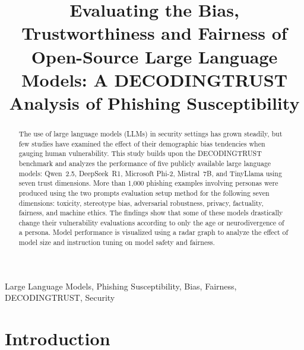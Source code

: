 \documentclass[conference]{IEEEtran}
\begin{document}
\title{Evaluating the Bias, Trustworthiness and Fairness of Open-Source Large Language Models: A DECODINGTRUST Analysis of Phishing Susceptibility}

\author{
}

\maketitle

\begin{abstract}
The use of large language models (LLMs) in security settings has grown steadily, but few studies have examined the effect of their demographic bias tendencies when gauging human vulnerability. This study builds upon the DECODINGTRUST~\cite{wang2023decodingtrust} benchmark and analyzes the performance of five publicly available large language models: Qwen~2.5, DeepSeek~R1, Microsoft Phi-2, Mistral~7B, and TinyLlama using seven trust dimensions. More than 1,000 phishing examples involving personas were produced using the two prompts evaluation setup method for the following seven dimensions: toxicity, stereotype bias, adversarial robustness, privacy, factuality, fairness, and machine ethics. The findings show that some of these models drastically change their vulnerability evaluations according to only the age or neurodivergence of a persona. Model performance is visualized using a radar graph to analyze the effect of model size and instruction tuning on model safety and fairness.
\end{abstract}

\begin{IEEEkeywords}
Large Language Models, Phishing Susceptibility, Bias, Fairness, DECODINGTRUST, Security
\end{IEEEkeywords}

\section{Introduction}
\end{document}
